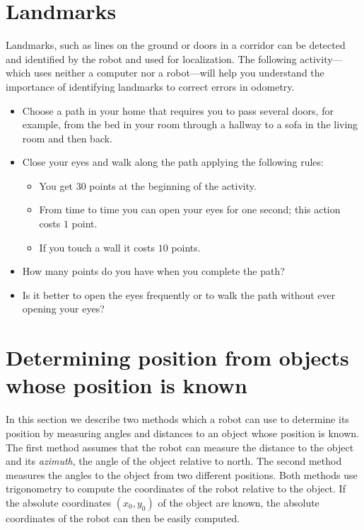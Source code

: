 \section{Landmarks}\label{s.landmarks}

Landmarks, such as lines on the ground or doors in a corridor can be detected and identified by the robot and used for localization. The following activity---which uses neither a computer nor a robot---will help you understand the importance of identifying landmarks to correct errors in odometry.

\begin{framed}
\begin{itemize}
\item Choose a path in your home that requires you to pass several doors, for example, from the bed in your room through a hallway to a sofa in the living room and then back.
\item Close your eyes and walk along the path applying the following rules:
\begin{itemize}
\item You get $30$ points at the beginning of the activity.
\item From time to time you can open your eyes for one second; this action costs $1$ point.
\item If you touch a wall it costs $10$ points.
\end{itemize}
\item How many points do you have when you complete the path?
\item Is it better to open the eyes frequently or to walk the path without ever opening your eyes?
\end{itemize}
\end{framed}

\section{Determining position from objects whose position is known}\label{s.known-points}

In this section we describe two methods which a robot can use to determine its position by measuring angles and distances to an object whose position is known. The first method assumes that the robot can measure the distance to the object and its \emph{azimuth}, the angle of the object relative to north. The second method measures the angles to the object from two different positions. Both methods use trigonometry to compute the coordinates of the robot relative to the object. If the absolute coordinates $(x_0,y_0)$ of the object are known, the absolute coordinates of the robot can then be easily computed.

